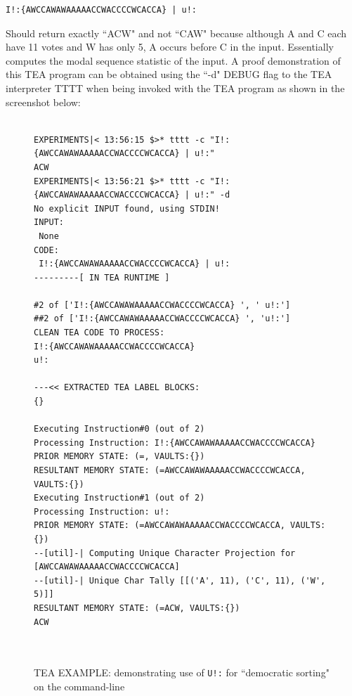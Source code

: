 \documentclass[a4paper, 18pt]{book} %
\begin{document}
{{{\vspace{1em}

  \begin{tcolorbox}[teaterminalstyle, title=U: EXAMPLE 1: Tallying Votes (Democratic Sorting), breakable]
  \begin{lstlisting}[language=TEA,breaklines=true,]
I!:{AWCCAWAWAAAAACCWACCCCWCACCA} | u!:
   \end{lstlisting}
  \end{tcolorbox}

\vspace{1em}


Should return exactly ``ACW" and not ``CAW" because although A and C each have 11 votes and W has only 5, A occurs before C in the input. Essentially computes the modal sequence statistic of the input. A proof demonstration of this TEA program can be obtained using the ``-d" DEBUG flag to the TEA interpreter TTTT when being invoked with the TEA program as shown in the screenshot below:

\vspace{2em}

\begin{figure}[H]
  \begin{tcolorbox}[myterminalstyle, title=TEA Applied to Tallying Votes]
  \begin{lstlisting}
 
EXPERIMENTS|< 13:56:15 $>* tttt -c "I!:{AWCCAWAWAAAAACCWACCCCWCACCA} | u!:"
ACW
EXPERIMENTS|< 13:56:21 $>* tttt -c "I!:{AWCCAWAWAAAAACCWACCCCWCACCA} | u!:" -d
No explicit INPUT found, using STDIN!
INPUT:
 None
CODE:
 I!:{AWCCAWAWAAAAACCWACCCCWCACCA} | u!:
---------[ IN TEA RUNTIME ]

#2 of ['I!:{AWCCAWAWAAAAACCWACCCCWCACCA} ', ' u!:']
##2 of ['I!:{AWCCAWAWAAAAACCWACCCCWCACCA} ', 'u!:']
CLEAN TEA CODE TO PROCESS:
I!:{AWCCAWAWAAAAACCWACCCCWCACCA}
u!:

---<< EXTRACTED TEA LABEL BLOCKS:
{}

Executing Instruction#0 (out of 2)
Processing Instruction: I!:{AWCCAWAWAAAAACCWACCCCWCACCA}
PRIOR MEMORY STATE: (=, VAULTS:{})
RESULTANT MEMORY STATE: (=AWCCAWAWAAAAACCWACCCCWCACCA, VAULTS:{})
Executing Instruction#1 (out of 2)
Processing Instruction: u!:
PRIOR MEMORY STATE: (=AWCCAWAWAAAAACCWACCCCWCACCA, VAULTS:{})
--[util]-| Computing Unique Character Projection for [AWCCAWAWAAAAACCWACCCCWCACCA]
--[util]-| Unique Char Tally [[('A', 11), ('C', 11), ('W', 5)]]
RESULTANT MEMORY STATE: (=ACW, VAULTS:{})
ACW

             
  \end{lstlisting}
  \end{tcolorbox}
  \caption{TEA EXAMPLE: demonstrating use of \texttt{U!:} for ``democratic sorting" on the command-line}
\end{figure}


}}}
\end{document}
